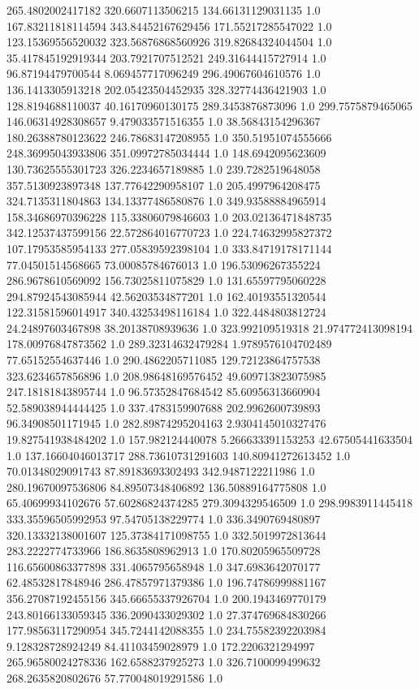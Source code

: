 265.4802002417182	320.6607113506215	134.66131129031135	1.0
167.83211818114594	343.84452167629456	171.55217285547022	1.0
123.15369556520032	323.56876868560926	319.82684324044504	1.0
35.417845192919344	203.7921707512521	249.31644415727914	1.0
96.87194479700544	8.069457717096249	296.49067604610576	1.0
136.1413305913218	202.05423504452935	328.32774436421903	1.0
128.8194688110037	40.16170960130175	289.3453876873096	1.0
299.7575879465065	146.06314928308657	9.479033571516355	1.0
38.56843154296367	180.26388780123622	246.78683147208955	1.0
350.51951074555666	248.36995043933806	351.09972785034444	1.0
148.6942095623609	130.73625555301723	326.2234657189885	1.0
239.7282519648058	357.5130923897348	137.77642290958107	1.0
205.4997964208475	324.7135311804863	134.13377486580876	1.0
349.93588884965914	158.34686970396228	115.33806079846603	1.0
203.02136471848735	342.12537437599156	22.572864016770723	1.0
224.74632995827372	107.17953585954133	277.05839592398104	1.0
333.84719178171144	77.04501514568665	73.00085784676013	1.0
196.53096267355224	286.9678610569092	156.73025811075829	1.0
131.65597795060228	294.87924543085944	42.56203534877201	1.0
162.40193551320544	122.31581596014917	340.43253498116184	1.0
322.4484803812724	24.24897603467898	38.20138708939636	1.0
323.992109519318	21.974772413098194	178.00976847873562	1.0
289.32314632479284	1.9789576104702489	77.65152554637446	1.0
290.4862205711085	129.72123864757538	323.6234657856896	1.0
208.98648169576452	49.609713823075985	247.18181843895744	1.0
96.57352847684542	85.60956313660904	52.589038944444425	1.0
337.4783159907688	202.9962600739893	96.34908501171945	1.0
282.89874295204163	2.9304145010327476	19.827541938484202	1.0
157.982124440078	5.266633391153253	42.67505441633504	1.0
137.16604046013717	288.73610731291603	140.80941272613452	1.0
70.01348029091743	87.89183693302493	342.9487122211986	1.0
280.19670097536806	84.89507348406892	136.50889164775808	1.0
65.40699934102676	57.60286824374285	279.3094329546509	1.0
298.9983911445418	333.35596505992953	97.54705138229774	1.0
336.3490769480897	320.13332138001607	125.37384171098755	1.0
332.5019972813644	283.2222774733966	186.8635808962913	1.0
170.80205965509728	116.65600863377898	331.4065795658948	1.0
347.6983642070177	62.48532817848946	286.47857971379386	1.0
196.74786999881167	356.27087192455156	345.66655337926704	1.0
200.1943469770179	243.80166133059345	336.2090433029302	1.0
27.374769684830266	177.98563117290954	345.7244142088355	1.0
234.75582392203984	9.128328728924249	84.41103459028979	1.0
172.2206321294997	265.96580024278336	162.6588237925273	1.0
326.7100099499632	268.2635820802676	57.770048019291586	1.0
